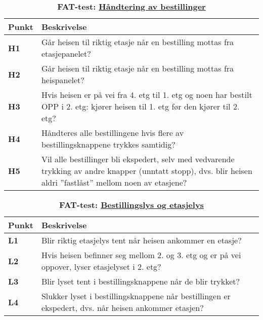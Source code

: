 \begin{table}[H]
    \centering
    \caption*{\textbf{\textcolor{RWTHrot100}{FAT-test}: \underline{Håndtering av bestillinger}}}
    \begin{tabular}{@{}  |p{1.25cm}| p{12.25cm}|  @{}}
    \hline
      \textbf{Punkt}             & \textbf{Beskrivelse} \\
    \hline
    \textbf{\textcolor{RWTHrot100}{H1}} & Går heisen til riktig etasje når en bestilling mottas fra etasjepanelet?\\\cline{1-2} 
    \textbf{\textcolor{RWTHrot100}{H2}} & Går heisen til riktig etasje når en bestilling mottas fra heispanelet?\\\cline{1-2} 
    \textbf{\textcolor{RWTHrot100}{H3}} & Hvis heisen er på vei fra 4. etg til 1. etg og noen har bestilt OPP i 2. etg:
 kjører heisen til 1. etg før den kjører til 2. etg?\\\cline{1-2} 
 \textbf{\textcolor{RWTHrot100}{H4}} & Håndteres alle bestillingene hvis flere av bestillingsknappene trykkes samtidig?\\\cline{1-2} 
 \textbf{\textcolor{RWTHrot100}{H5}} & Vil alle bestillinger bli ekspedert, selv med vedvarende trykking av andre knapper (unntatt stopp),
 dvs. blir heisen aldri ”fastlåst” mellom noen av etasjene?\\\cline{1-2} 
    \end{tabular}
\end{table}


\begin{table}[H]
    \centering
    \caption*{\textbf{\textcolor{RWTHrot100}{FAT-test}: \underline{Bestillingslys og etasjelys}}}
    \begin{tabular}{@{}  |p{1.25cm}| p{12.25cm}|  @{}}
    \hline
      \textbf{Punkt}             & \textbf{Beskrivelse} \\
    \hline
    \textbf{\textcolor{RWTHrot100}{L1}} & Blir riktig etasjelys tent når heisen ankommer en etasje?\\\cline{1-2} 
    \textbf{\textcolor{RWTHrot100}{L2}} & Hvis heisen befinner seg mellom 2. og 3. etg og er på vei oppover, lyser etasjelyset i 2. etg?\\\cline{1-2} 
    \textbf{\textcolor{RWTHrot100}{L3}} & Blir lyset tent i bestillingsknappene når de blir trykket?\\\cline{1-2} 
 \textbf{\textcolor{RWTHrot100}{L4}} & Slukker lyset i bestillingsknappene når bestillingen er ekspedert, dvs. når heisen ankommer etasjen?\\\cline{1-2} 
    \end{tabular}
\end{table}


